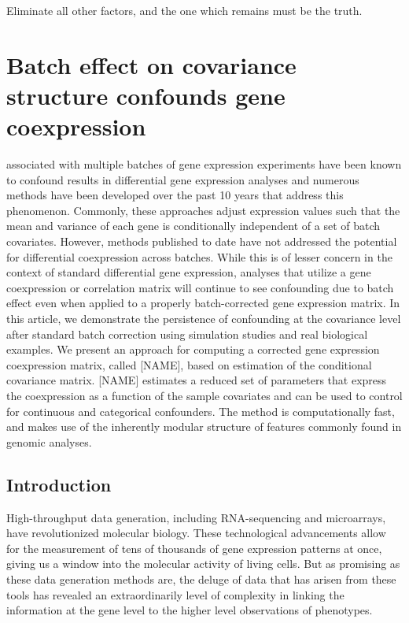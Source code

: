 \begin{savequote}[75mm]
Eliminate all other factors, and the one which remains must be the truth.
\end{savequote}

\chapter{Batch effect on covariance structure confounds gene coexpression}

associated with multiple batches of gene expression
experiments have been known to confound results in differential gene
expression analyses and numerous methods have been developed over
the past 10 years that address this phenomenon. Commonly, these approaches
adjust expression values such that the mean and variance of each gene
is conditionally independent of a set of batch covariates. However,
methods published to date have not addressed the potential for differential
coexpression across batches. While this is of lesser concern in the
context of standard differential gene expression, analyses that utilize
a gene coexpression or correlation matrix will continue to see confounding
due to batch effect even when applied to a properly batch-corrected
gene expression matrix. In this article, we demonstrate the persistence
of confounding at the covariance level after standard batch correction
using simulation studies and real biological examples. We present
an approach for computing a corrected gene expression coexpression
matrix, called {[}NAME{]}, based on estimation of the conditional
covariance matrix. {[}NAME{]} estimates a reduced set of parameters
that express the coexpression as a function of the sample covariates
and can be used to control for continuous and categorical confounders.
The method is computationally fast, and makes use of the inherently
modular structure of features commonly found in genomic analyses.

\section{Introduction}

High-throughput data generation, including RNA-sequencing and microarrays,
have revolutionized molecular biology. These technological advancements
allow for the measurement of tens of thousands of gene expression
patterns at once, giving us a window into the molecular activity of
living cells. But as promising as these data generation methods are,
the deluge of data that has arisen from these tools has revealed an
extraordinarily level of complexity in linking the information at
the gene level to the higher level observations of phenotypes.

